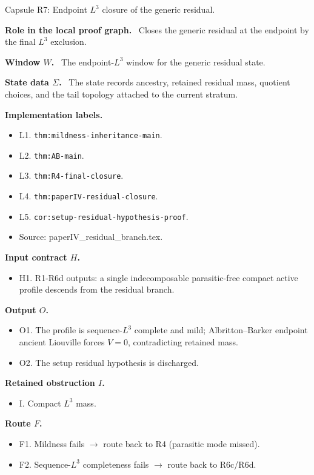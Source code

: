 \documentclass[11pt]{amsart}
\newcommand{\capsulefield}[1]{\par\smallskip\noindent\textbf{#1.}\ }
\begin{document}
\begin{proofcapsule}{Capsule R7: Endpoint $L^3$ closure of the generic residual.}
  \capsulefield{Role in the local proof graph}
  Closes the generic residual at the endpoint by the final \(L^3\) exclusion.

  \capsulefield{Window \(W\)}
The endpoint-$L^3$ window for the generic residual state.

  \capsulefield{State data \(\Sigma\)}
The state records ancestry, retained residual mass, quotient choices, and the tail topology attached to the current stratum.

  \capsulefield{Implementation labels}
  \begin{itemize}[leftmargin=1.8em]
  \item L1. \texttt{thm:mildness-inheritance-main}.
  \item L2. \texttt{thm:AB-main}.
  \item L3. \texttt{thm:R4-final-closure}.
  \item L4. \texttt{thm:paperIV-residual-closure}.
  \item L5. \texttt{cor:setup-residual-hypothesis-proof}.
  \item Source: paperIV\_residual\_branch.tex.
  \end{itemize}

  \capsulefield{Input contract \(H\)}
  \begin{itemize}[leftmargin=1.8em]
  \item H1. R1-R6d outputs: a single indecomposable parasitic-free compact active profile descends from the residual branch.
  \end{itemize}

  \capsulefield{Output \(O\)}
  \begin{itemize}[leftmargin=1.8em]
  \item O1. The profile is sequence-\(L^3\) complete and mild; Albritton--Barker endpoint ancient Liouville forces \(V=0\), contradicting retained mass.
  \item O2. The setup residual hypothesis is discharged.
  \end{itemize}

  \capsulefield{Retained obstruction \(I\)}
  \begin{itemize}[leftmargin=1.8em]
  \item I. Compact $L^3$ mass.
  \end{itemize}

  \capsulefield{Route \(F\)}
  \begin{itemize}[leftmargin=1.8em]
  \item F1. Mildness fails $\to$ route back to R4 (parasitic mode missed).
  \item F2. Sequence-$L^3$ completeness fails $\to$ route back to R6c/R6d.
  \end{itemize}


\end{proofcapsule}
\end{document}
